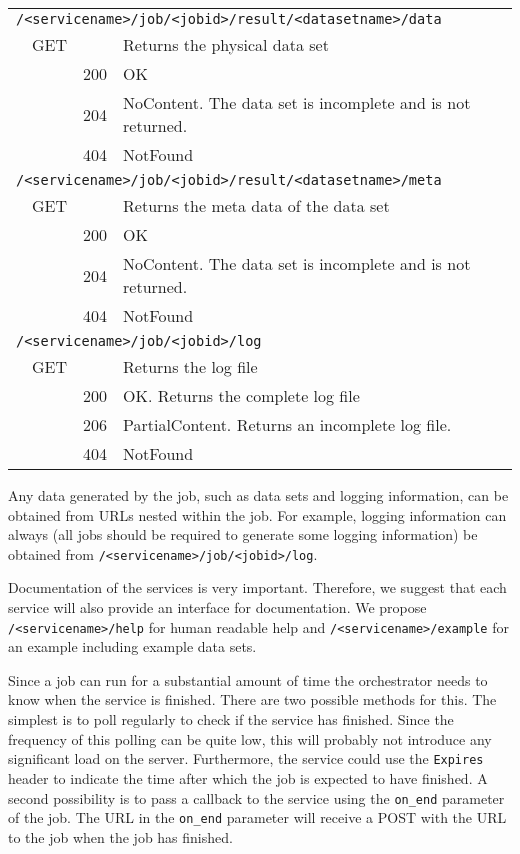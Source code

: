 \documentclass[a4paper]{article}
\begin{document}
\begin{table}
\begin{tabular}{l l l p{}}
    \multicolumn{4}{l}{\texttt{/<servicename>/job/<jobid>/result/<datasetname>/data}} \\
    & GET &    & Returns the physical data set \\
    &   & 200  & OK \\
    &   & 204  & NoContent. The data set is incomplete and is not returned. \\
    &   & 404  & NotFound \\

    \multicolumn{4}{l}{\texttt{/<servicename>/job/<jobid>/result/<datasetname>/meta}} \\
    & GET &    & Returns the meta data of the data set \\
    &   & 200  & OK \\
    &   & 204  & NoContent. The data set is incomplete and is not returned. \\
    &   & 404  & NotFound \\

    \multicolumn{4}{l}{\texttt{/<servicename>/job/<jobid>/log}} \\
    & GET &    & Returns the log file \\
    &   & 200  & OK. Returns the complete log file \\
    &   & 206  & PartialContent. Returns an incomplete log file. \\
    &   & 404  & NotFound \\
    \bottomrule
  \end{tabular}
\end{table}

Any data generated by the job, such as data sets and logging information, can be
obtained from URLs nested within the job. For example, logging information can
always (all jobs should be required to generate some logging information) be
obtained from \texttt{/<servicename>/job/<jobid>/log}. 

Documentation of the services is very important. Therefore, we suggest that each
service will also provide an interface for documentation. We propose
\texttt{/<servicename>/help} for human readable help and
\texttt{/<servicename>/example} for an example including example data sets. 

Since a job can run for a substantial amount of time the orchestrator needs to
know when the service is finished. There are two possible methods for this. The
simplest is to poll regularly to check if the service has finished. Since the
frequency of this polling can be quite low, this will probably not introduce any
significant load on the server. Furthermore, the service could use the
\texttt{Expires} header to indicate the time after which the job is expected to
have finished. A second possibility is to pass a callback to the service using
the \texttt{on\_end} parameter of the job. The URL in the \texttt{on\_end}
parameter will receive a POST with the URL to the job when the job has finished. 
\end{document}
